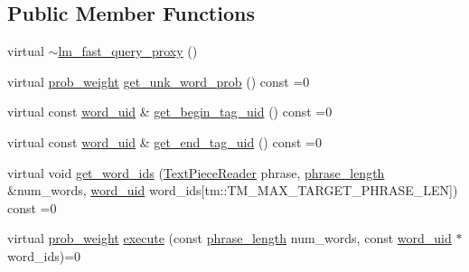 \subsection*{Public Member Functions}
\begin{DoxyCompactItemize}
\item 
virtual \hyperlink{classuva_1_1smt_1_1bpbd_1_1server_1_1lm_1_1proxy_1_1lm__fast__query__proxy_a6b4664af2410afab683fd1bead0b1e70}{$\sim$lm\+\_\+fast\+\_\+query\+\_\+proxy} ()
\item 
virtual \hyperlink{namespaceuva_1_1smt_1_1bpbd_1_1server_a01e9ea4de9c226f4464862e84ff0bbcc}{prob\+\_\+weight} \hyperlink{classuva_1_1smt_1_1bpbd_1_1server_1_1lm_1_1proxy_1_1lm__fast__query__proxy_a29b76828280a46ed9b412cdefbc322cc}{get\+\_\+unk\+\_\+word\+\_\+prob} () const  =0
\item 
virtual const \hyperlink{namespaceuva_1_1smt_1_1bpbd_1_1server_a6bfe45ba344d65a7fdd7d26156328ddc}{word\+\_\+uid} \& \hyperlink{classuva_1_1smt_1_1bpbd_1_1server_1_1lm_1_1proxy_1_1lm__fast__query__proxy_a369852874000538d14dda7ed8fea9176}{get\+\_\+begin\+\_\+tag\+\_\+uid} () const  =0
\item 
virtual const \hyperlink{namespaceuva_1_1smt_1_1bpbd_1_1server_a6bfe45ba344d65a7fdd7d26156328ddc}{word\+\_\+uid} \& \hyperlink{classuva_1_1smt_1_1bpbd_1_1server_1_1lm_1_1proxy_1_1lm__fast__query__proxy_a9649253956a68463a4f6f0bffd325ace}{get\+\_\+end\+\_\+tag\+\_\+uid} () const  =0
\item 
virtual void \hyperlink{classuva_1_1smt_1_1bpbd_1_1server_1_1lm_1_1proxy_1_1lm__fast__query__proxy_a637b1314f8e00fd7c985bce920adee00}{get\+\_\+word\+\_\+ids} (\hyperlink{classuva_1_1utils_1_1file_1_1_text_piece_reader}{Text\+Piece\+Reader} phrase, \hyperlink{namespaceuva_1_1smt_1_1bpbd_1_1server_af068a19c2e03116caf3e3827a3e40e35}{phrase\+\_\+length} \&num\+\_\+words, \hyperlink{namespaceuva_1_1smt_1_1bpbd_1_1server_a6bfe45ba344d65a7fdd7d26156328ddc}{word\+\_\+uid} word\+\_\+ids\mbox{[}tm\+::\+T\+M\+\_\+\+M\+A\+X\+\_\+\+T\+A\+R\+G\+E\+T\+\_\+\+P\+H\+R\+A\+S\+E\+\_\+\+L\+E\+N\mbox{]}) const  =0
\item 
virtual \hyperlink{namespaceuva_1_1smt_1_1bpbd_1_1server_a01e9ea4de9c226f4464862e84ff0bbcc}{prob\+\_\+weight} \hyperlink{classuva_1_1smt_1_1bpbd_1_1server_1_1lm_1_1proxy_1_1lm__fast__query__proxy_afa170cafb434dec366b290e2eee8278a}{execute} (const \hyperlink{namespaceuva_1_1smt_1_1bpbd_1_1server_af068a19c2e03116caf3e3827a3e40e35}{phrase\+\_\+length} num\+\_\+words, const \hyperlink{namespaceuva_1_1smt_1_1bpbd_1_1server_a6bfe45ba344d65a7fdd7d26156328ddc}{word\+\_\+uid} $\ast$word\+\_\+ids)=0

\end{DoxyCompactItemize}
